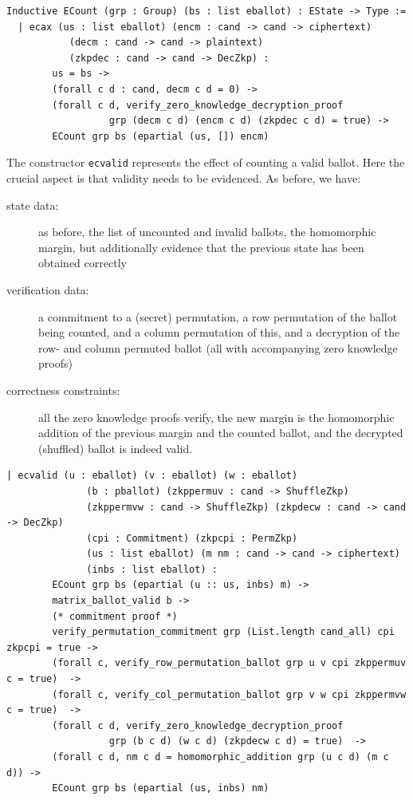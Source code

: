 \begin{lstlisting}[frame=single,basicstyle=\ttfamily\footnotesize]
 Inductive ECount (grp : Group) (bs : list eballot) : EState -> Type :=
  | ecax (us : list eballot) (encm : cand -> cand -> ciphertext)
           (decm : cand -> cand -> plaintext)
           (zkpdec : cand -> cand -> DecZkp) :
        us = bs ->
        (forall c d : cand, decm c d = 0) -> 
        (forall c d, verify_zero_knowledge_decryption_proof 
                  grp (decm c d) (encm c d) (zkpdec c d) = true) ->
        ECount grp bs (epartial (us, []) encm)
\end{lstlisting}



The constructor \texttt{ecvalid} represents the effect of counting a
valid ballot. Here the crucial aspect is that validity needs to be
evidenced. As before, we have:
\begin{description}
  \item[state data:] as before, the list of uncounted and invalid
  ballots, the homomorphic margin, but additionally evidence that
  the previous state has been obtained correctly
  \item[verification data:]
  a commitment to a (secret) permutation, a row permutation of the
  ballot being counted, and a column permutation of this, and a
  decryption of the row- and column permuted ballot (all with
  accompanying zero knowledge proofs)
  \item[correctness constraints:] all the zero knowledge proofs
  verify, the new margin is the homomorphic addition of the previous
  margin and the counted ballot, and the decrypted (shuffled)
  ballot is indeed valid.
\end{description}

\begin{lstlisting}[frame=single,basicstyle=\ttfamily\footnotesize]
  | ecvalid (u : eballot) (v : eballot) (w : eballot)
              (b : pballot) (zkppermuv : cand -> ShuffleZkp)
              (zkppermvw : cand -> ShuffleZkp) (zkpdecw : cand -> cand -> DecZkp)
              (cpi : Commitment) (zkpcpi : PermZkp)
              (us : list eballot) (m nm : cand -> cand -> ciphertext)
              (inbs : list eballot) :
        ECount grp bs (epartial (u :: us, inbs) m) ->
        matrix_ballot_valid b ->
        (* commitment proof *)
        verify_permutation_commitment grp (List.length cand_all) cpi zkpcpi = true ->
        (forall c, verify_row_permutation_ballot grp u v cpi zkppermuv c = true)  ->
        (forall c, verify_col_permutation_ballot grp v w cpi zkppermvw c = true)  ->
        (forall c d, verify_zero_knowledge_decryption_proof 
                  grp (b c d) (w c d) (zkpdecw c d) = true)  ->
        (forall c d, nm c d = homomorphic_addition grp (u c d) (m c d)) -> 
        ECount grp bs (epartial (us, inbs) nm)
       \end{lstlisting}
 
